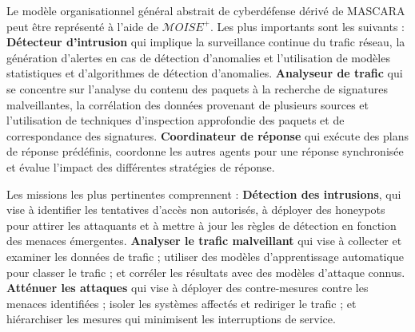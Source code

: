 Le modèle organisationnel général abstrait de cyberdéfense dérivé de MASCARA peut être représenté à l'aide de $\mathcal{M}OISE^+$. Les plus importants sont les suivants :
%
%
%
\textbf{Détecteur d'intrusion} qui implique la surveillance continue du trafic réseau, la génération d'alertes en cas de détection d'anomalies et l'utilisation de modèles statistiques et d'algorithmes de détection d'anomalies.
%
\textbf{Analyseur de trafic} qui se concentre sur l'analyse du contenu des paquets à la recherche de signatures malveillantes, la corrélation des données provenant de plusieurs sources et l'utilisation de techniques d'inspection approfondie des paquets et de correspondance des signatures.
%
\textbf{Coordinateur de réponse} qui exécute des plans de réponse prédéfinis, coordonne les autres agents pour une réponse synchronisée et évalue l'impact des différentes stratégies de réponse.


Les missions les plus pertinentes comprennent :
%
\textbf{Détection des intrusions}, qui vise à identifier les tentatives d'accès non autorisés, à déployer des honeypots pour attirer les attaquants et à mettre à jour les règles de détection en fonction des menaces émergentes.
%
\textbf{Analyser le trafic malveillant} qui vise à collecter et examiner les données de trafic ; utiliser des modèles d'apprentissage automatique pour classer le trafic ; et corréler les résultats avec des modèles d'attaque connus.
%
\textbf{Atténuer les attaques} qui vise à déployer des contre-mesures contre les menaces identifiées ; isoler les systèmes affectés et rediriger le trafic ; et hiérarchiser les mesures qui minimisent les interruptions de service.


